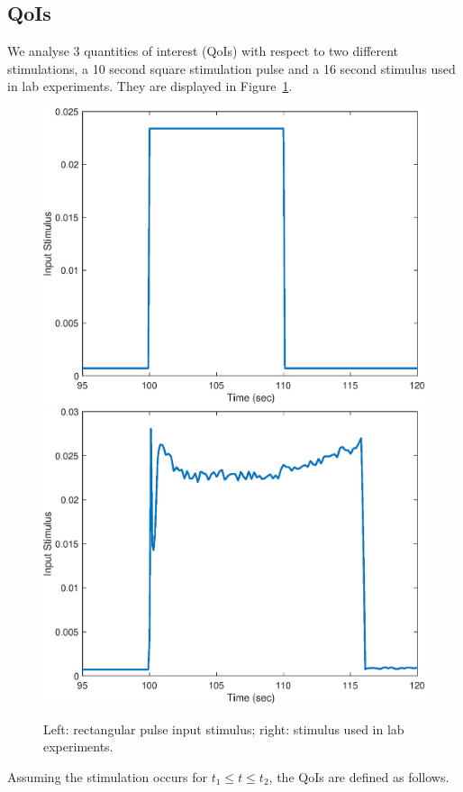 \documentclass[12pt]{article}
\numberwithin{equation}{section}
\begin{document}
\subsection{QoIs}
We analyse 3 quantities of interest (QoIs) with respect to two different stimulations, a 10 second square stimulation pulse and a 16 second stimulus used in lab experiments. They are displayed in Figure~\ref{input_stimuli}.
\begin{figure}[h]
\centering
\includegraphics[width=.4 \textwidth]{Figures/Rectangular_Stimulus.eps}
\includegraphics[width=.4 \textwidth]{Figures/Experimental_Stimulus.eps}
\caption{Left: rectangular pulse input stimulus; right: stimulus used in lab experiments.}
\label{input_stimuli}
\end{figure}
 Assuming the stimulation occurs for $t_1\le t \le t_2$, the QoIs are defined as follows.
\end{document}
